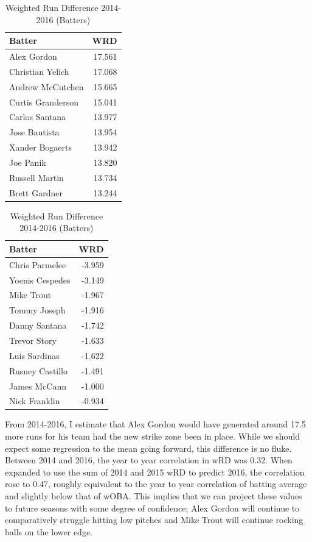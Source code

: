 \documentclass[11pt]{article}
\begin{document}
\begin{table}[ht]
\centering
\begin{tabular}{lr}
  \hline
Batter & WRD \\ 
  \hline
Alex Gordon & 17.561 \\ 
  Christian Yelich & 17.068 \\ 
  Andrew McCutchen & 15.665 \\ 
  Curtis Granderson & 15.041 \\ 
  Carlos Santana & 13.977 \\ 
  Jose Bautista & 13.954 \\ 
  Xander Bogaerts & 13.942 \\ 
  Joe Panik & 13.820 \\ 
  Russell Martin & 13.734 \\ 
  Brett Gardner & 13.244 \\ 
   \hline
\end{tabular}
\quad
\begin{tabular}{lr}
  \hline
Batter & WRD \\ 
  \hline
Chris Parmelee & -3.959 \\ 
  Yoenis Cespedes & -3.149 \\ 
  Mike Trout & -1.967 \\ 
  Tommy Joseph & -1.916 \\ 
  Danny Santana & -1.742 \\ 
  Trevor Story & -1.633 \\ 
  Luis Sardinas & -1.622 \\ 
  Rusney Castillo & -1.491 \\ 
  James McCann & -1.000 \\ 
  Nick Franklin & -0.934 \\ 
   \hline
\end{tabular}
\caption{Weighted Run Difference 2014-2016 (Batters)}
\end{table}

From 2014-2016, I estimate that Alex Gordon would have generated around 17.5 more runs for his team had the new strike zone been in place.  While we should expect some regression to the mean going forward, this difference is no fluke.  Between 2014 and 2016, the year to year correlation in wRD was 0.32.  When expanded to use the sum of 2014 and 2015 wRD to predict 2016, the correlation rose to 0.47, roughly equivalent to the year to year correlation of batting average and slightly below that of wOBA. This implies that we can project these values to future seasons with some degree of confidence; Alex Gordon will continue to comparatively struggle hitting low pitches and Mike Trout will continue rocking balls on the lower edge.\\
\end{document}
